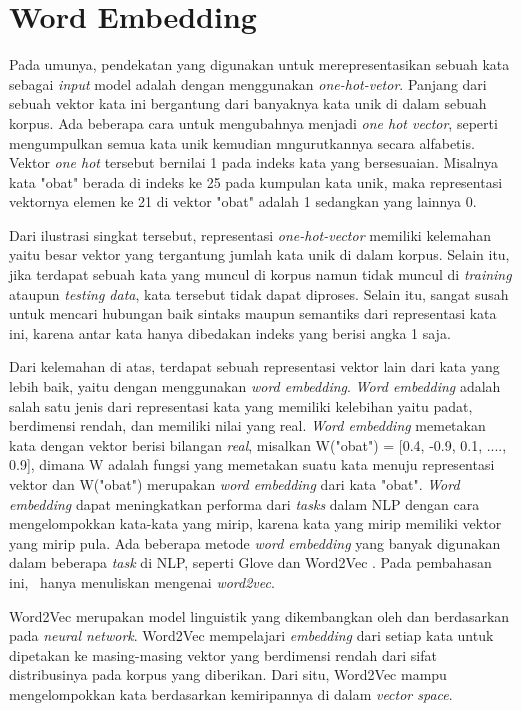 \section{Word Embedding}
Pada umunya, pendekatan yang digunakan untuk merepresentasikan sebuah kata sebagai \textit{input} model adalah dengan menggunakan \textit{one-hot-vetor}. Panjang dari sebuah vektor kata ini bergantung dari banyaknya kata unik di dalam sebuah korpus. Ada beberapa cara untuk mengubahnya menjadi \textit{one hot vector}, seperti mengumpulkan semua kata unik kemudian mngurutkannya secara alfabetis. Vektor \textit{one hot} tersebut bernilai 1 pada indeks kata yang bersesuaian. Misalnya kata "obat" berada di indeks ke 25 pada kumpulan kata unik, maka representasi vektornya elemen ke 21 di vektor "obat" adalah 1 sedangkan yang lainnya 0.

Dari ilustrasi singkat tersebut, representasi \textit{one-hot-vector} memiliki kelemahan yaitu besar vektor yang tergantung jumlah kata unik di dalam korpus. Selain itu, jika terdapat sebuah kata yang muncul di korpus namun tidak muncul di \textit{training} ataupun \textit{testing data}, kata tersebut tidak dapat diproses. Selain itu, sangat susah untuk mencari hubungan baik sintaks maupun semantiks dari representasi kata ini, karena antar kata hanya dibedakan indeks yang berisi angka 1 saja.

Dari kelemahan di atas, terdapat sebuah representasi vektor lain dari kata yang lebih baik, yaitu dengan menggunakan \textit{word embedding}. \textit{Word embedding} adalah salah satu jenis dari representasi kata yang memiliki kelebihan yaitu padat, berdimensi rendah, dan memiliki nilai yang real. \textit{Word embedding} memetakan kata dengan vektor berisi bilangan \textit{real}, misalkan W("obat") = [0.4, -0.9, 0.1, ...., 0.9], dimana W adalah fungsi yang memetakan suatu kata menuju representasi vektor dan W("obat") merupakan \textit{word embedding} dari kata "obat". \textit{Word embedding} dapat meningkatkan performa dari \textit{tasks} dalam NLP dengan cara mengelompokkan kata-kata yang mirip, karena kata yang mirip memiliki vektor yang mirip pula. Ada beberapa metode \textit{word embedding} yang banyak digunakan dalam beberapa \textit{task} di NLP, seperti Glove \citep{pennington2014glove} dan Word2Vec \citep{mikolov2014word2vec}. Pada pembahasan ini, \saya~hanya menuliskan mengenai \textit{word2vec}.

Word2Vec merupakan model linguistik yang dikembangkan oleh \cite{mikolov} dan berdasarkan pada \textit{neural network}. Word2Vec mempelajari \textit{embedding} dari setiap kata untuk dipetakan ke masing-masing vektor yang berdimensi rendah dari sifat distribusinya pada korpus yang diberikan. Dari situ, Word2Vec mampu mengelompokkan kata berdasarkan kemiripannya di dalam \textit{vector space}.

